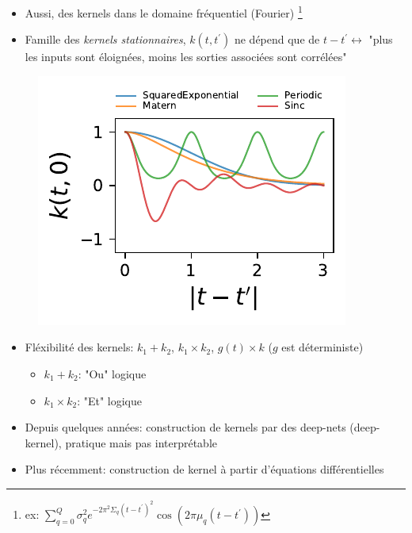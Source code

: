 \documentclass[xcolor=svgnames, t]{beamer}
\newcommand{\coloredemph}[1]{\textcolor{internationalblue}{\emph{#1}}}
\begin{document}
\begin{frame}{\subsecname}
  \begin{itemize}
    \item Aussi, des kernels dans le domaine fréquentiel (Fourier)
    \footnote{ex: $\sum_{q=0}^Q \sigma_q^2 e^{-2 \pi^2 \Sigma_q (t-t^\prime)^2} \cos(2\pi \mu_q (t-t^\prime))$}
  \pause
    \item Famille des \coloredemph{kernels stationnaires}, 
    $k(t, t^\prime)$ ne dépend que de $t - t^\prime \leftrightarrow $ "plus les inputs sont éloignées, moins les sorties associées sont corrélées"
  \end{itemize}
  \begin{figure}
    \includegraphics[scale=0.80]{autocov_gp_1D.pdf}
  \end{figure}
\end{frame}

\begin{frame}{\subsecname}
  \begin{itemize}
    \item Fléxibilité des kernels: $k_1 + k_2$, $k_1 \times k_2$, $g(t) \times k$ ($g$ est déterministe)
  \pause
    \begin{itemize}
      \item $k_1 + k_2$: "Ou" logique
      \item $k_1 \times k_2$: "Et" logique
    \end{itemize}
    \item Depuis quelques années: construction de kernels par des deep-nets (deep-kernel), pratique mais pas interprétable
  \pause
    \item Plus récemment: construction de kernel à  partir d'équations différentielles
  \end{itemize}
\end{frame}
\end{document}
